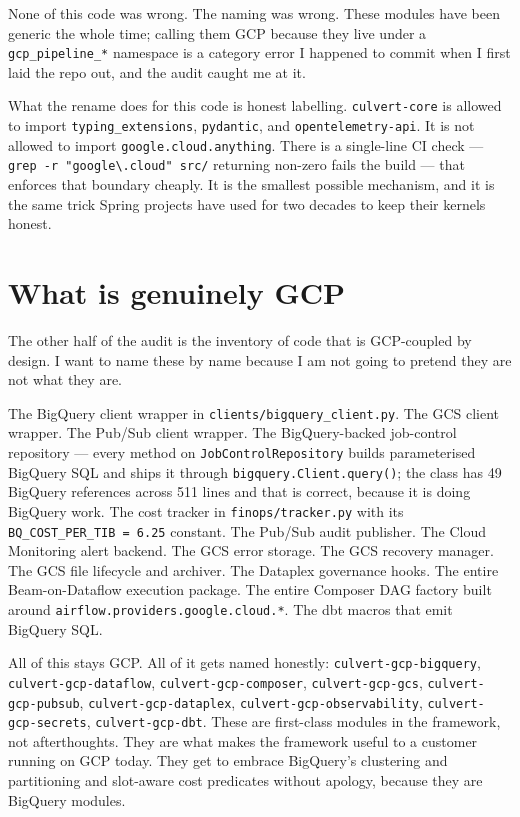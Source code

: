 \documentclass[
  11pt,
  british,
  oneside]{book}
\begin{document}
None of this code was wrong. The naming was wrong. These modules have
been generic the whole time; calling them GCP because they live under a
\texttt{gcp\_pipeline\_*} namespace is a category error I happened to
commit when I first laid the repo out, and the audit caught me at it.

What the rename does for this code is honest labelling.
\texttt{culvert-core} is allowed to import \texttt{typing\_extensions},
\texttt{pydantic}, and \texttt{opentelemetry-api}. It is not allowed to
import \texttt{google.cloud.anything}. There is a single-line CI check
--- \texttt{grep\ -r\ "google\textbackslash{}.cloud"\ src/} returning
non-zero fails the build --- that enforces that boundary cheaply. It is
the smallest possible mechanism, and it is the same trick Spring
projects have used for two decades to keep their kernels honest.

\hypertarget{what-is-genuinely-gcp}{%
\section{What is genuinely GCP}\label{what-is-genuinely-gcp}}

The other half of the audit is the inventory of code that is GCP-coupled
by design. I want to name these by name because I am not going to
pretend they are not what they are.

The BigQuery client wrapper in
\texttt{clients/bigquery\_client.py}. The
GCS client wrapper. The Pub/Sub client wrapper. The BigQuery-backed
job-control repository --- every method on \texttt{JobControlRepository}
builds parameterised BigQuery SQL and ships it through
\texttt{bigquery.Client.query()}; the class has 49 BigQuery references
across 511 lines and that is correct, because it is doing BigQuery
work. The cost tracker in
\texttt{finops/tracker.py} with its \texttt{BQ\_COST\_PER\_TIB\ =\ 6.25}
constant. The Pub/Sub audit publisher. The Cloud Monitoring alert
backend. The GCS error storage. The GCS recovery manager. The GCS file
lifecycle and archiver. The Dataplex governance hooks. The entire
Beam-on-Dataflow execution package. The entire Composer DAG factory
built around \texttt{airflow.providers.google.cloud.*}. The dbt macros
that emit BigQuery SQL.

All of this stays GCP. All of it gets named honestly:
\texttt{culvert-gcp-bigquery}, \texttt{culvert-gcp-dataflow},
\texttt{culvert-gcp-composer}, \texttt{culvert-gcp-gcs},
\texttt{culvert-gcp-pubsub}, \texttt{culvert-gcp-dataplex},
\texttt{culvert-gcp-observability}, \texttt{culvert-gcp-secrets},
\texttt{culvert-gcp-dbt}. These are first-class modules in the
framework, not afterthoughts. They are what makes the framework useful
to a customer running on GCP today. They get to embrace BigQuery's
clustering and partitioning and slot-aware cost predicates without
apology, because they are BigQuery modules.
\end{document}
